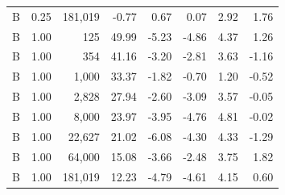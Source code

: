 \begin{tabular}{lrrrrrrr}
B & 0.25 & 181,019 & -0.77 & 0.67 & 0.07 & 2.92 & 1.76 \\
B & 1.00 & 125 & 49.99 & -5.23 & -4.86 & 4.37 & 1.26 \\
B & 1.00 & 354 & 41.16 & -3.20 & -2.81 & 3.63 & -1.16 \\
B & 1.00 & 1,000 & 33.37 & -1.82 & -0.70 & 1.20 & -0.52 \\
B & 1.00 & 2,828 & 27.94 & -2.60 & -3.09 & 3.57 & -0.05 \\
B & 1.00 & 8,000 & 23.97 & -3.95 & -4.76 & 4.81 & -0.02 \\
B & 1.00 & 22,627 & 21.02 & -6.08 & -4.30 & 4.33 & -1.29 \\
B & 1.00 & 64,000 & 15.08 & -3.66 & -2.48 & 3.75 & 1.82 \\
B & 1.00 & 181,019 & 12.23 & -4.79 & -4.61 & 4.15 & 0.60 \\
\bottomrule
\end{tabular}
